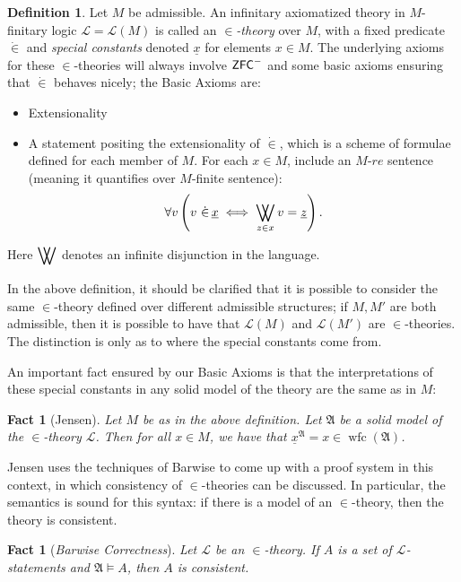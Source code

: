 \documentclass{amsart}
\newtheorem{fact}[theorem]{Fact}
\theoremstyle{definition}
\newtheorem{definition}[theorem]{Definition}
\theoremstyle{remark}
\newcommand{\ZFC}{\textup{\ensuremath{\textsf{ZFC}}}}
\DeclareMathOperator{\wfc}{wfc}
\DeclareMathOperator*{\bigdoublevee}{\bigvee\mkern-15mu\bigvee}
\begin{document}
\begin{definition} \label{def:InTheoriesAndBasicAxioms} Let $M$ be admissible. An infinitary axiomatized theory in $M$-finitary logic $\mathcal L=\mathcal L(M)$ is called an \textit{$\in$-theory} over $M$, with a fixed predicate $\dot \in$ and \emph{special constants} denoted $\underline x$ for elements $x \in M$. The underlying axioms for these $\in$-theories will always involve $\ZFC^-$ and some basic axioms ensuring that $\dot \in$ behaves nicely; 
the \textsf{Basic Axioms} are: \begin{itemize}
	\item \textsf{Extensionality}
	\item A statement positing the extensionality of $\dot \in$, which is a scheme of formulae defined for each member of $M$. For each $x \in M$, include an $M$-$re$ sentence (meaning it quantifies over $M$-finite sentence): 
	$$\forall v \left( v \ \dot \in\, \underline x \iff \bigdoublevee_{z \in x} v= \underline z \right).$$
\end{itemize} Here $\displaystyle\bigdoublevee$ denotes an infinite disjunction in the language.\end{definition}

In the above definition, it should be clarified that it is possible to consider the same $\in$-theory defined over different admissible structures; if $M, M'$ are both admissible, then it is possible to have that $\mathcal L(M)$ and $\mathcal L(M')$ are $\in$-theories. The distinction is only as to where the special constants come from. 

An important fact ensured by our \textsf{Basic Axioms} is that the interpretations of these special constants in any solid model of the theory are the same as in $M$:

\begin{fact}[Jensen] \label{fact:PointofBasicAxioms} Let $M$ be as in the above definition. Let $\mathfrak A$ be a solid model of the $\in$-theory $\mathcal L$. Then for all $x \in M$, we have that $\underline{x}^{\mathfrak A} = x \in \wfc(\mathfrak A)$. \end{fact}

Jensen uses the techniques of Barwise to come up with a proof system in this context, in which consistency of $\in$-theories can be discussed. In particular, the semantics is sound for this syntax: if there is a model of an \(\in\)-theory, then the theory is consistent. 
\begin{fact}[\emph{Barwise Correctness}] \label{fact:correctness} 
Let $\mathcal L$ be an $\in$-theory. If $A$ is a set of $\mathcal L$-statements and $\mathfrak A \models A$, then $A$ is consistent. \end{fact}
\end{document}
